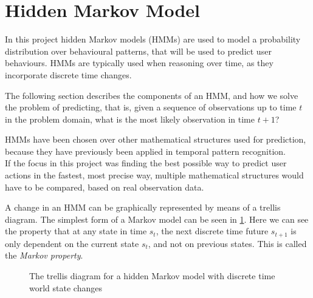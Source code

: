 \section{Hidden Markov Model}
\label{sec:hmm}
In this project hidden Markov models (HMMs) are used to model a probability distribution over behavioural patterns, that will be used to predict user behaviours. HMMs are typically used when reasoning over time, as they incorporate discrete time changes.

The following section describes the components of an HMM, and how we solve the problem of predicting, that is, given a sequence of observations up to time $t$ in the problem domain, what is the most likely observation in time $t+1$?

HMMs have been chosen over other mathematical structures used for prediction, because they have previously been applied in temporal pattern recognition.
\\If the focus in this project was finding the best possible way to predict user actions in the fastest, most precise way, multiple mathematical structures would have to be compared, based on real observation data.

A change in an HMM can be graphically represented by means of a trellis diagram\cite{russell2010artificial}. The simplest form of a Markov model can be seen in \cref{fig:1stMarkovModel}. Here we can see the property that at any state in time $s_t$, the next discrete time future $s_{t+1}$ is only dependent on the current state $s_t$, and not on previous states. This is called the \emph{Markov property}.

\begin{figure}[htbp]
\centering
{}
\caption[Trellis diagram for a simple Markov model]{The trellis diagram for a hidden Markov model with discrete time world state changes}\label{fig:1stMarkovModel}
\end{figure}

